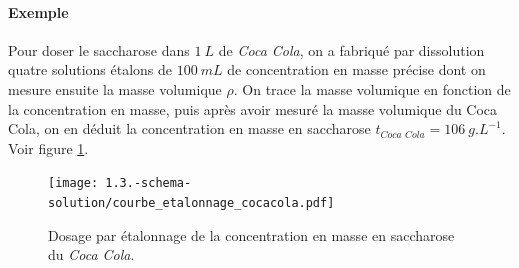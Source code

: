 \paragraph{Exemple}
Pour doser le saccharose dans $1~L$ de \textit{Coca Cola}, on a fabriqué par dissolution quatre solutions étalons de $100~mL$ de concentration en masse précise dont on mesure ensuite la masse volumique $\rho $. On trace   la masse volumique en fonction de la concentration en masse, puis après avoir mesuré la masse volumique du Coca Cola, on en déduit la concentration en masse en saccharose $t_{\textit{Coca Cola}} = 106~g.L^{-1}$.
Voir figure \ref{fig:courbe_etalonnage_cocacola}.
\begin{figure}[h!]
  \begin{center}
      \texttt{[image: 1.3.-schema-solution/courbe\_etalonnage\_cocacola.pdf]}
  \end{center}
  \caption{Dosage par étalonnage de la concentration en masse en saccharose du \textit{Coca Cola}.}
  \label{fig:courbe_etalonnage_cocacola}
\end{figure}

      